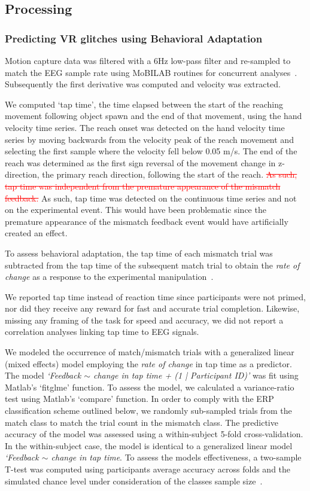 \subsection{Processing}

\subsubsection{Predicting VR glitches using Behavioral Adaptation}

Motion capture data was filtered with a 6Hz low-pass filter and re-sampled to match the EEG sample rate using MoBILAB routines for concurrent analyses~\cite{Ojeda2014-ev}. Subsequently the first derivative was computed and velocity was extracted. 

We computed `tap time', the time elapsed between the start of the reaching movement following object spawn and the end of that movement, using the hand velocity time series. The reach onset was detected on the hand velocity time series by moving backwards from the velocity peak of the reach movement and selecting the first sample where the velocity fell below 0.05 m/s. The end of the reach was determined as the first sign reversal of the movement change in z-direction, the primary reach direction, following the start of the reach. \textcolor{red}{\st{As such, tap time was independent from the premature appearance of the mismatch feedback.}}
\textcolor{n}{As such, tap time was detected on the continuous time series and not on the experimental event. This would have been problematic since the premature appearance of the mismatch feedback event would have artificially created an effect.}

To assess behavioral adaptation, the tap time of each mismatch trial was subtracted from the tap time of the subsequent match trial to obtain the \textit{rate of change} as a response to the experimental manipulation~\cite{Dutilh2012-ps}.

We reported tap time instead of reaction time since participants were not primed, nor did they receive any reward for fast and accurate trial completion. Likewise, missing any framing of the task for speed and accuracy, we did not report a correlation analyses linking tap time to EEG signals.

We modeled the occurrence of match/mismatch trials with a generalized linear (mixed effects) model employing the \textit{rate of change} in tap time as a predictor. The model \textit{`Feedback $\sim$ change in tap time + (1 | Participant ID)'} was fit using Matlab's `fitglme' function. To assess the model, we calculated a variance-ratio test using Matlab's `compare' function. In order to comply with the ERP classification scheme outlined below, we randomly sub-sampled trials from the match class to match the trial count in the mismatch class. The predictive accuracy of the model was assessed using a within-subject 5-fold cross-validation. In the within-subject case, the model is identical to a generalized linear model \textit{`Feedback $\sim$ change in tap time}. To assess the models effectiveness, a two-sample T-test was computed using participants average accuracy across folds and the simulated chance level under consideration of the classes sample size~\cite{Muller-Putz2007-oc}.


